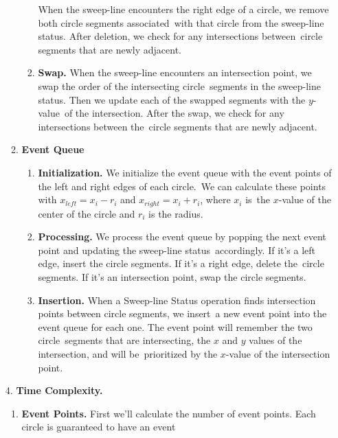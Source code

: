 \documentclass[11pt]{article}
\begin{document}
\begin{solution}
\begin{enumerate}
\begin{enumerate}
\begin{enumerate}
              When the sweep-line encounters the right edge of a circle, we remove both circle segments associated\
              with that circle from the sweep-line status. After deletion, we check for any intersections between\
              circle segments that are newly adjacent.
            \item \textbf{Swap.}
              When the sweep-line encounters an intersection point, we swap the order of the intersecting circle\
              segments in the sweep-line status. Then we update each of the swapped segments with the \(y\)-value\
              of the intersection. After the swap, we check for any intersections between the\
              circle segments that are newly adjacent.
          \end{enumerate}
        \item \textbf{Event Queue}
          \begin{enumerate}
            \item \textbf{Initialization.}
              We initialize the event queue with the event points of the left and right edges of each circle.\
              We can calculate these points with \(x_{left} = x_i - r_i\) and \(x_{right} = x_i + r_i\), where \(x_i\) is\
              the \(x\)-value of the center of the circle and \(r_i\) is the radius.
            \item \textbf{Processing.}
              We process the event queue by popping the next event point and updating the sweep-line status\
              accordingly. If it's a left edge, insert the circle segments. If it's a right edge, delete the\
              circle segments. If it's an intersection point, swap the circle segments.
            \item \textbf{Insertion.}
              When a Sweep-line Status operation finds intersection points between circle segments, we insert\
              a new event point into the event queue for each one. The event point will remember the two circle\
              segments that are intersecting, the \(x\) and \(y\) values of the intersection, and will be\
              prioritized by the \(x\)-value of the intersection point.
          \end{enumerate}
      \end{enumerate}
    \item[4.] \textbf{Time Complexity.}
      \begin{enumerate}
        \item \textbf{Event Points.}
          First we'll calculate the number of event points. Each circle is guaranteed to have an event\

\end{enumerate}
\end{enumerate}
\end{solution}
\end{document}
